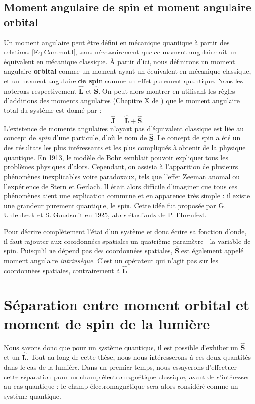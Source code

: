 \subsection{Moment angulaire de spin et moment angulaire orbital}
Un moment angulaire peut être défini en mécanique quantique à partir des relations \ref{Eq.CommutJ}, sans nécessairement que ce moment angulaire ait un équivalent en mécanique classique. \`A partir d'ici, nous définirons un moment angulaire \textbf{orbital} comme un moment ayant un équivalent en mécanique classique, et un moment angulaire \textbf{de spin} comme un effet purement quantique. Nous les noterons respectivement $\bm{\hat{L}}$ et $\bm{\hat{S}}$. On peut alors montrer en utilisant les règles d'additions des moments angulaires (Chapitre X de ) que le moment angulaire total du système est donné par :
\begin{equation}
\bm{\hat{J}}=\bm{\hat{L}}+\bm{\hat{S}}.
\label{Eq.JegalLplusS}
\end{equation}
L'existence de moments angulaires n'ayant pas d'équivalent classique est liée au concept de \textit{spin} d'une particule, d'où le nom de $\bm{\hat{S}}$. Le concept de spin a été un des résultats les plus intéressants et les plus compliqués à obtenir de la physique quantique. En 1913, le modèle de Bohr semblait pouvoir expliquer tous les problèmes physiques d'alors. Cependant, on assista à l'apparition de plusieurs phénomènes inexplicables voire paradoxaux, tels que l'effet Zeeman anomal ou l'expérience de Stern et Gerlach. Il était alors difficile d'imaginer que tous ces phénomènes aient une explication commune et en apparence très simple : il existe une grandeur purement quantique, le spin. Cette idée fut proposée par G. Uhlenbeck et S. Goudsmit en 1925, alors étudiants de P. Ehrenfest. 

Pour décrire complètement l'état d'un système et donc écrire sa fonction d'onde, il faut rajouter aux coordonnées spatiales un quatrième paramètre - la variable de spin. Puisqu'il ne dépend pas des coordonnées spatiales, $\bm{\hat{S}}$ est également appelé moment angulaire \textit{intrinsèque}. C'est un opérateur qui n'agit pas sur les coordonnées spatiales, contrairement à $\bm{\hat{L}}$. 

\section{Séparation entre moment orbital et moment de spin de la lumière}
Nous savons donc que pour un système quantique, il est possible d'exhiber un $\bm{\hat{S}}$ et un $\bm{\hat{L}}$. Tout au long de cette thèse, nous nous intéresserons à ces deux quantités dans le cas de la lumière. Dans un premier temps, nous essayerons d'effectuer cette séparation pour un champ électromagnétique classique, avant de s'intéresser au cas quantique : le champ électromagnétique sera alors considéré comme un système quantique.

